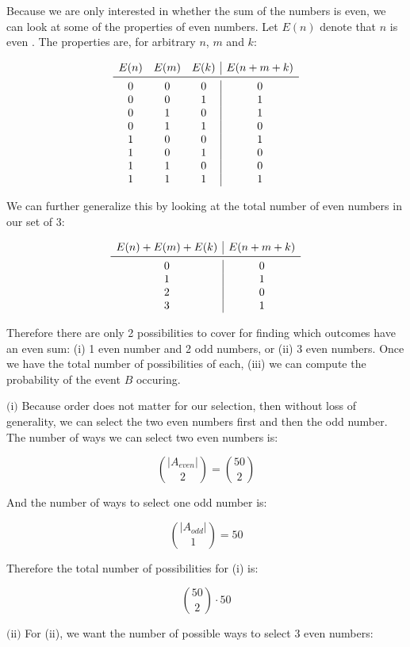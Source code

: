 \documentclass{article}
\newcommand{\subproblem}[1]{$\boxed{\text{(#1)}}$}
\begin{document}
\begin{multicols*}{2}
Because we are only interested in whether the sum of the numbers is
even, we can look at some of the properties of even numbers. Let
$E(n)$ denote that $n$ is even . The properties are, for arbitrary
$n$, $m$ and $k$:

\[
\begin{array}{ccc|c}
E(n) & E(m) & E(k) & E(n+m+k) \\
\midrule
0 & 0 & 0 & 0 \\
0 & 0 & 1 & 1 \\
0 & 1 & 0 & 1 \\
0 & 1 & 1 & 0 \\
1 & 0 & 0 & 1 \\
1 & 0 & 1 & 0 \\
1 & 1 & 0 & 0 \\
1 & 1 & 1 & 1 \\
\end{array}
\]

We can further generalize this by looking at the total number of even
numbers in our set of 3:

\[
\begin{array}{c|c}
E(n)+E(m)+E(k) & E(n+m+k) \\
\midrule
0 & 0 \\
1 & 1 \\
2 & 0 \\
3 & 1 \\
\end{array}
\]

Therefore there are only 2 possibilities to cover for finding which
outcomes have an even sum: (i) 1 even number and 2 odd numbers, or
(ii) 3 even numbers. Once we have the total number of possibilities of
each, (iii) we can compute the probability of the event $B$ occuring.

%
\subproblem{i} Because order does not matter for our selection, then
without loss of generality, we can select the two even numbers first
and then the odd number. The number of ways we can select two even
numbers is:

\[
\binom{|A_{even}|}{2}=\binom{50}{2}
\]

And the number of ways to select one odd number is:

\[
\binom{|A_{odd}|}{1}=50
\]

Therefore the total number of possibilities for (i) is:

\[
\binom{50}{2}\cdot 50
\]

%
\subproblem{ii} For (ii), we want the number of possible ways to
select 3 even numbers:


\end{multicols*}
\end{document}
